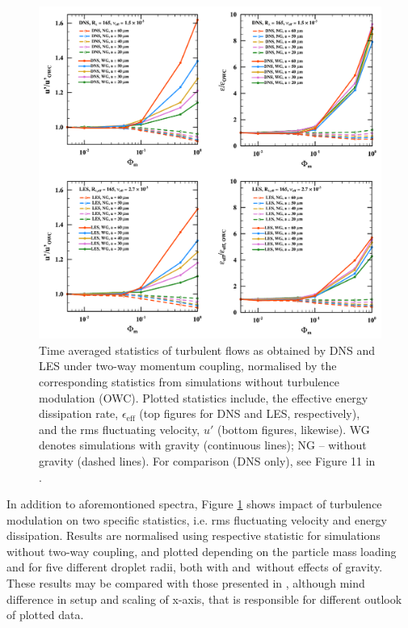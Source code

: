 \documentclass{pracamgren}
\begin{document}
\begin{figure}[h]
\centering
\includegraphics[width=13.5cm]{img/plots/2-1-4c-modstat.pdf}
\caption{
Time averaged statistics of turbulent flows as obtained by DNS and LES under two-way momentum coupling, normalised by the corresponding statistics from simulations without turbulence modulation (OWC).
Plotted statistics include, the effective energy dissipation rate, $\epsilon_{\text{eff}}$ (top figures for DNS and LES, respectively), and the rms fluctuating velocity, $u'$ (bottom figures, likewise).
WG denotes simulations with gravity (continuous lines); NG -- without gravity (dashed lines).
For comparison (DNS only), see Figure 11 in \textcite{Rosa2020}.
}
\label{fig:modstat}
\end{figure}

In addition to aforemontioned spectra, Figure \ref{fig:modstat} shows impact of turbulence modulation on two specific statistics, i.e. rms fluctuating velocity and energy dissipation.
Results are normalised using respective statistic for simulations without two-way coupling, and plotted depending on the particle mass loading and for five different droplet radii, both with and~without effects of gravity.
These results may be compared with those presented in \textcite[Fig. 11]{Rosa2020}, although mind difference in setup and scaling of x-axis, that is responsible for different outlook of plotted data.
\end{document}
